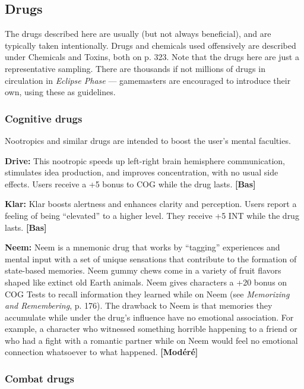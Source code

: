 {{\subsection{Drugs} \label{sec:drugs} 

The drugs described here are usually (but not always beneficial), and are typically taken intentionally. Drugs and chemicals used offensively are described under Chemicals and Toxins, both on p. 323. Note that the drugs here are just a representative sampling. There are thousands if not millions of drugs in circulation in \emph{Eclipse Phase} --- gamemasters are encouraged to introduce their own, using these as guidelines. 

\subsubsection{Cognitive drugs} 

Nootropics and similar drugs are intended to boost the user’s mental faculties. 

\textbf{Drive:} This nootropic speeds up left-right brain hemisphere communication, stimulates idea production, and improves concentration, with no usual side effects. Users receive a +5 bonus to COG while the drug lasts. \textbf{[Bas]} 

\textbf{Klar:} Klar boosts alertness and enhances clarity and perception. Users report a feeling of being ``elevated'' to a higher level. They receive +5 INT while the drug lasts. \textbf{[Bas]} 

\textbf{Neem:} Neem is a mnemonic drug that works by ``tagging'' experiences and mental input with a set of unique sensations that contribute to the formation of state-based memories. Neem gummy chews come in a variety of fruit flavors shaped like extinct old Earth animals. Neem gives characters a +20 bonus on COG Tests to recall information they learned while on Neem (see \emph{Memorizing and Remembering}, p. 176). The drawback to Neem is that memories they accumulate while under the drug’s influence have no emotional association. For example, a character who witnessed something horrible happening to a friend or who had a fight with a romantic partner while on Neem would feel no emotional connection whatsoever to what happened. \textbf{[Modéré]} 

\subsubsection{Combat drugs} 

}}

